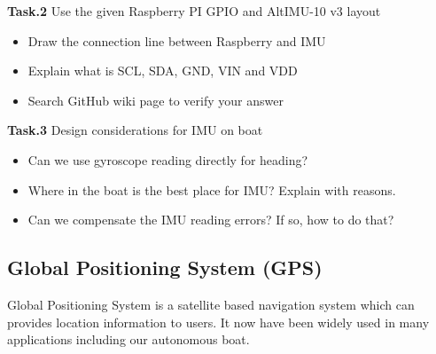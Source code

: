 \documentclass[]{article}
\begin{document}
 \textbf{Task.2} Use the given Raspberry PI GPIO and AltIMU-10 v3 layout 
 \begin{itemize}
 	\item Draw the connection line between Raspberry and IMU
 	\item Explain what is SCL, SDA, GND, VIN and VDD
 	\item Search GitHub wiki page to verify your answer
 \end{itemize}


\textbf{Task.3} Design considerations for IMU on boat
\begin{itemize}
	\item Can we use gyroscope reading directly for heading?
	\item Where in the boat is the best place for IMU? Explain with reasons.  
	\item  Can we compensate the IMU reading errors? If so, how to do that? 
\end{itemize}


\subsection{Global Positioning System (GPS)}
Global Positioning System is a satellite based navigation system which can provides location information to users. It now have been widely used in many applications including our autonomous boat. \\
\end{document}
